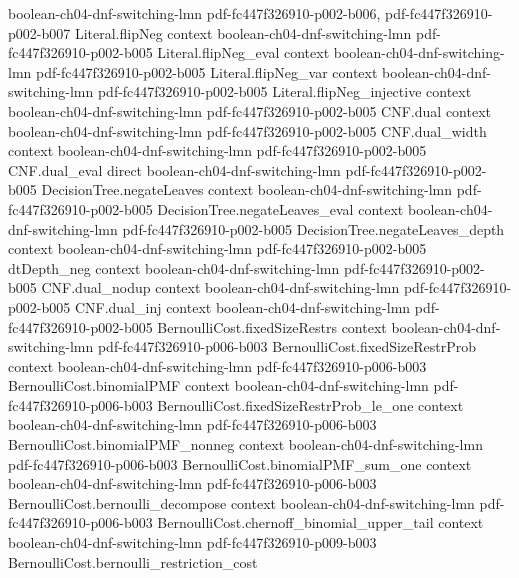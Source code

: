 \begin{lemma}
  {boolean-ch04-dnf-switching-lmn}
  {pdf-fc447f326910-p002-b006,
    pdf-fc447f326910-p002-b007}
\proofstep
  {Literal.flipNeg}
  {context}
  {boolean-ch04-dnf-switching-lmn}
  {pdf-fc447f326910-p002-b005}
\proofstep
  {Literal.flipNeg_eval}
  {context}
  {boolean-ch04-dnf-switching-lmn}
  {pdf-fc447f326910-p002-b005}
\proofstep
  {Literal.flipNeg_var}
  {context}
  {boolean-ch04-dnf-switching-lmn}
  {pdf-fc447f326910-p002-b005}
\proofstep
  {Literal.flipNeg_injective}
  {context}
  {boolean-ch04-dnf-switching-lmn}
  {pdf-fc447f326910-p002-b005}
\proofstep
  {CNF.dual}
  {context}
  {boolean-ch04-dnf-switching-lmn}
  {pdf-fc447f326910-p002-b005}
\proofstep
  {CNF.dual_width}
  {context}
  {boolean-ch04-dnf-switching-lmn}
  {pdf-fc447f326910-p002-b005}
\proofstep
  {CNF.dual_eval}
  {direct}
  {boolean-ch04-dnf-switching-lmn}
  {pdf-fc447f326910-p002-b005}
\proofstep
  {DecisionTree.negateLeaves}
  {context}
  {boolean-ch04-dnf-switching-lmn}
  {pdf-fc447f326910-p002-b005}
\proofstep
  {DecisionTree.negateLeaves_eval}
  {context}
  {boolean-ch04-dnf-switching-lmn}
  {pdf-fc447f326910-p002-b005}
\proofstep
  {DecisionTree.negateLeaves_depth}
  {context}
  {boolean-ch04-dnf-switching-lmn}
  {pdf-fc447f326910-p002-b005}
\proofstep
  {dtDepth_neg}
  {context}
  {boolean-ch04-dnf-switching-lmn}
  {pdf-fc447f326910-p002-b005}
\proofstep
  {CNF.dual_nodup}
  {context}
  {boolean-ch04-dnf-switching-lmn}
  {pdf-fc447f326910-p002-b005}
\proofstep
  {CNF.dual_inj}
  {context}
  {boolean-ch04-dnf-switching-lmn}
  {pdf-fc447f326910-p002-b005}
\proofstep
  {BernoulliCost.fixedSizeRestrs}
  {context}
  {boolean-ch04-dnf-switching-lmn}
  {pdf-fc447f326910-p006-b003}
\proofstep
  {BernoulliCost.fixedSizeRestrProb}
  {context}
  {boolean-ch04-dnf-switching-lmn}
  {pdf-fc447f326910-p006-b003}
\proofstep
  {BernoulliCost.binomialPMF}
  {context}
  {boolean-ch04-dnf-switching-lmn}
  {pdf-fc447f326910-p006-b003}
\proofstep
  {BernoulliCost.fixedSizeRestrProb_le_one}
  {context}
  {boolean-ch04-dnf-switching-lmn}
  {pdf-fc447f326910-p006-b003}
\proofstep
  {BernoulliCost.binomialPMF_nonneg}
  {context}
  {boolean-ch04-dnf-switching-lmn}
  {pdf-fc447f326910-p006-b003}
\proofstep
  {BernoulliCost.binomialPMF_sum_one}
  {context}
  {boolean-ch04-dnf-switching-lmn}
  {pdf-fc447f326910-p006-b003}
\proofstep
  {BernoulliCost.bernoulli_decompose}
  {context}
  {boolean-ch04-dnf-switching-lmn}
  {pdf-fc447f326910-p006-b003}
\proofstep
  {BernoulliCost.chernoff_binomial_upper_tail}
  {context}
  {boolean-ch04-dnf-switching-lmn}
  {pdf-fc447f326910-p009-b003}
\proofstep
  {BernoulliCost.bernoulli_restriction_cost}

\end{lemma}
